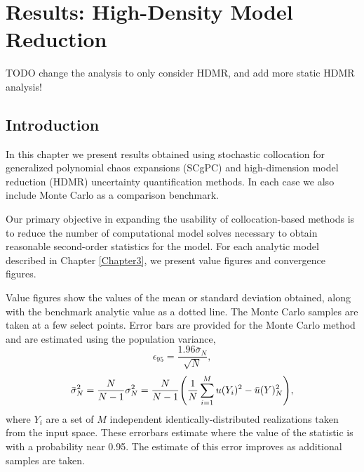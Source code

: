 
\chapter{Results: High-Density Model Reduction} %

\label{ch:results hdmr} %



TODO change the analysis to only consider HDMR, and add more static HDMR analysis!
\section{Introduction}
In this chapter we present results obtained using stochastic collocation for generalized polynomial chaos
expansions (SCgPC) and high-dimension model reduction (HDMR) uncertainty quantification methods.  In each case
we also include Monte Carlo as a comparison benchmark.

Our primary objective in expanding the usability of collocation-based methods is to reduce the number of
computational model solves necessary to obtain reasonable second-order statistics for the model.  For each
analytic model described in Chapter \ref{Chapter3}, we present value figures and convergence figures.  

Value figures show the values of the mean or standard deviation obtained, along with the benchmark analytic
value as a dotted line.  The Monte Carlo samples are taken at a few select points.  Error bars are provided
for the Monte Carlo method and are estimated using the population variance,
\begin{equation}
  \epsilon_{95} = \frac{1.96\bar\sigma_N}{\sqrt{N}},
\end{equation}
\begin{equation}
  \bar\sigma_N^2 = \frac{N}{N-1}\sigma^2_N = \frac{N}{N-1}\qty(\frac{1}{N}\sum_{i=1}^M u(Y_i)^2 - \bar
  u(Y)^2_N),
\end{equation}
where $Y_i$ are a set of $M$ independent identically-distributed realizations taken from the input space.
These errorbars estimate where the value of the statistic is with a probability near 0.95.  The estimate of
this error improves as additional samples are taken.


